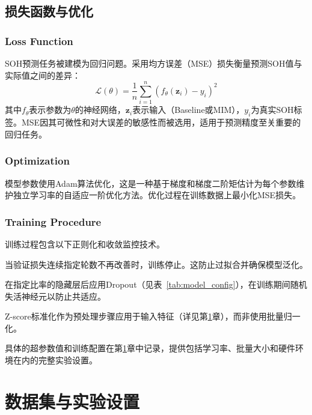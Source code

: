 \documentclass[10pt,a4paper]{ctexart}
\begin{document}
\subsection{损失函数与优化}\label{sec:optimization}

\subsubsection{Loss Function}

SOH预测任务被建模为回归问题。采用均方误差（MSE）损失衡量预测SOH值与实际值之间的差异：
\begin{equation}
    \mathcal{L}(\theta) = \frac{1}{n} \sum_{i=1}^{n} \left( f_{\theta}(\mathbf{z}_i) - y_i \right)^2
\end{equation}
其中$f_{\theta}$表示参数为$\theta$的神经网络，$\mathbf{z}_i$表示输入（Baseline或MIM），$y_i$为真实SOH标签。MSE因其可微性和对大误差的敏感性而被选用，适用于预测精度至关重要的回归任务。

\subsubsection{Optimization}

模型参数使用Adam算法优化，这是一种基于梯度和梯度二阶矩估计为每个参数维护独立学习率的自适应一阶优化方法。优化过程在训练数据上最小化MSE损失。

\subsubsection{Training Procedure}

训练过程包含以下正则化和收敛监控技术。

当验证损失连续指定轮数不再改善时，训练停止。这防止过拟合并确保模型泛化。

在指定比率的隐藏层后应用Dropout（见表~\ref{tab:model_config}），在训练期间随机失活神经元以防止共适应。

Z-score标准化作为预处理步骤应用于输入特征（详见第\ref{sec:dataset}章），而非使用批量归一化。

具体的超参数值和训练配置在第\ref{sec:dataset}章中记录，提供包括学习率、批量大小和硬件环境在内的完整实验设置。

\section{数据集与实验设置}\label{sec:dataset}
\end{document}
